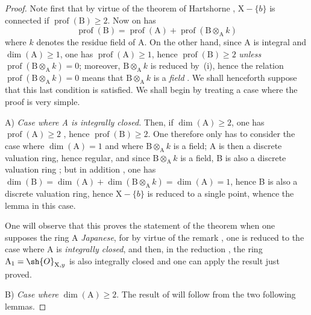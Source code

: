 \begin{proof}
Note first that by virtue of the theorem of Hartshorne , $\mathrm{X}-\{b\}$ is connected if $\operatorname{prof}(\mathrm{B})\geq 2$.
Now on has 
\begin{equation}
  \operatorname{prof}(\mathrm{B})=\operatorname{prof}(\mathrm{A})+\operatorname{prof}(\mathrm{B}\otimes_{\mathrm{A}}k)
  \tag{18.9.7.4}
\end{equation}
where $k$ denotes the residue field of A.
On the other hand, since A is integral and $\dim(\mathrm{A})\geq 1$, one has $\operatorname{prof}(\mathrm{A})\geq 1$, hence $\operatorname{prof}(\mathrm{B})\geq 2$ \emph{unless} $\operatorname{prof}(\mathrm{B}\otimes_{\mathrm{A}}k)=0$;
moreover, $\mathrm{B}\otimes_{\mathrm{A}}k$ is reduced by~(i), hence the relation $\operatorname{prof}(\mathrm{B}\otimes_{\mathrm{A}}k)=0$ means that $\mathrm{B}\otimes_{\mathrm{A}}k$ is a \emph{field} .
We shall henceforth suppose that this last condition is satisfied.
We shall begin by treating a case where the proof is very simple.

A) \emph{Case where A is integrally closed.}
Then, if $\dim(\mathrm{A})\geq 2$, one has $\operatorname{prof}(\mathrm{A})\geq 2$ , hence $\operatorname{prof}(\mathrm{B})\geq 2$.
One therefore only has to consider the case where $\dim(\mathrm{A})=1$ and where $\mathrm{B}\otimes_{\mathrm{A}}k$ is a field;
A is then a discrete valuation ring, hence regular, and since $\mathrm{B}\otimes_{\mathrm{A}}k$ is a field, B is also a discrete valuation ring ;
but in addition , one has $\dim(\mathrm{B})=\dim(\mathrm{A})+\dim(\mathrm{B}\otimes_{\mathrm{A}}k)=\dim(\mathrm{A})=1$, hence B is also a discrete valuation ring, hence $\mathrm{X}-\{b\}$ is reduced to a single point, whence the lemma  in this case.

One will observe that this proves the statement of the theorem  when one supposes the ring A \emph{Japanese}, for by virtue of the remark , one is reduced to the case where A is \emph{integrally closed}, and then, in the reduction , the ring $\mathrm{A}_1=\sh{O}_{\mathrm{X},y}$ is also integrally closed and one can apply the result just proved.

B) \emph{Case where} $\dim(\mathrm{A})\geq 2$.
The result of  will follow from the two following lemmas.
\end{proof}

